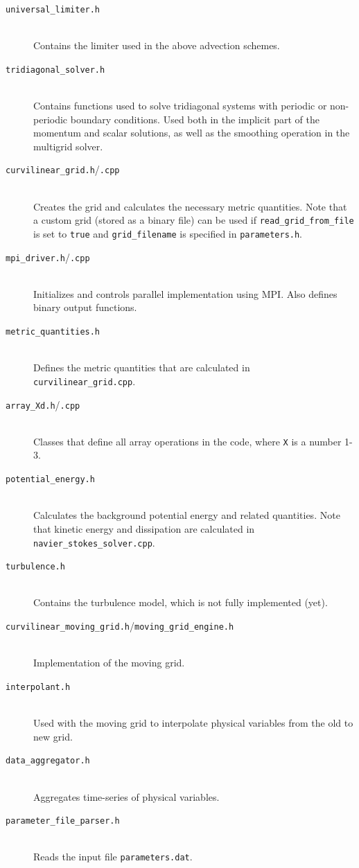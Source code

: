 \documentclass[12pt]{report}
\begin{document}
\begin{description}
\item[\texttt{universal\_limiter.h}] \hfill \\Contains the limiter used in the above advection schemes.
\item[\texttt{tridiagonal\_solver.h}] \hfill \\Contains functions used to solve tridiagonal systems with periodic or non-periodic boundary conditions. Used both in the implicit part of the momentum and scalar solutions, as well as the smoothing operation in the multigrid solver.
\item[\texttt{curvilinear\_grid.h}/\texttt{.cpp}] \hfill \\Creates the grid and calculates the necessary metric quantities. Note that a custom grid (stored as a binary file) can be used if \texttt{read\_grid\_from\_file} is set to \texttt{true} and \texttt{grid\_filename} is specified in \texttt{parameters.h}.
\item[\texttt{mpi\_driver.h}/\texttt{.cpp}] \hfill \\Initializes and controls parallel implementation using MPI. Also defines binary output functions.
\item[\texttt{metric\_quantities.h}] \hfill \\Defines the metric quantities that are calculated in \texttt{curvilinear\_grid.cpp}.
\item[\texttt{array\_Xd.h}/\texttt{.cpp}] \hfill \\Classes that define all array operations in the code, where \texttt{X} is a number 1-3.
\item[\texttt{potential\_energy.h}] \hfill \\Calculates the background potential energy and related quantities. Note that kinetic energy and dissipation are calculated in \texttt{navier\_stokes\_solver.cpp}.
\item[\texttt{turbulence.h}] \hfill \\Contains the turbulence model, which is not fully implemented (yet).
\item[\texttt{curvilinear\_moving\_grid.h}/\texttt{moving\_grid\_engine.h}] \hfill \\Implementation of the moving grid.
\item[\texttt{interpolant.h}] \hfill \\Used with the moving grid to interpolate physical variables from the old to new grid.
\item[\texttt{data\_aggregator.h}] \hfill \\Aggregates time-series of physical variables.
\item[\texttt{parameter\_file\_parser.h}] \hfill \\Reads the input file \texttt{parameters.dat}.
\end{description}
\end{document}

